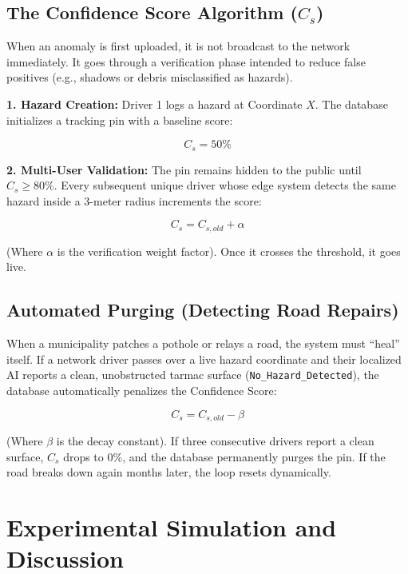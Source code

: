 \documentclass[conference]{IEEEtran}
\begin{document}
\subsection{The Confidence Score Algorithm ($C_s$)}

When an anomaly is first uploaded, it is not broadcast to the network immediately. It goes through a verification phase intended to reduce false positives (e.g., shadows or debris misclassified as hazards).

\textbf{1. Hazard Creation:} Driver 1 logs a hazard at Coordinate $X$. The database initializes a tracking pin with a baseline score:

\begin{equation}
C_s = 50\%
\label{eq:baseline}
\end{equation}

\textbf{2. Multi-User Validation:} The pin remains hidden to the public until $C_s \geq 80\%$. Every subsequent unique driver whose edge system detects the same hazard inside a 3-meter radius increments the score:

\begin{equation}
C_s = C_{s,old} + \alpha
\label{eq:validation}
\end{equation}

(Where $\alpha$ is the verification weight factor). Once it crosses the threshold, it goes live.

\subsection{Automated Purging (Detecting Road Repairs)}

When a municipality patches a pothole or relays a road, the system must ``heal'' itself. If a network driver passes over a live hazard coordinate and their localized AI reports a clean, unobstructed tarmac surface (\texttt{No\_Hazard\_Detected}), the database automatically penalizes the Confidence Score:

\begin{equation}
C_s = C_{s,old} - \beta
\label{eq:decay}
\end{equation}

(Where $\beta$ is the decay constant). If three consecutive drivers report a clean surface, $C_s$ drops to 0\%, and the database permanently purges the pin. If the road breaks down again months later, the loop resets dynamically.

\section{Experimental Simulation and Discussion}
\end{document}
